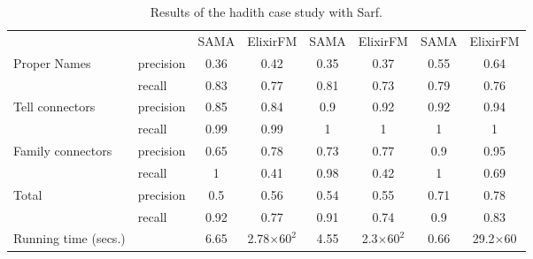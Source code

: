 \begin{table}
\begin{minipage}{\textwidth}
{\begin{tabular}{llcccccc}
          &       & SAMA  & ElixirFM & SAMA  & ElixirFM & SAMA  & ElixirFM \\
    \multicolumn{1}{l}{\multirow{2}[0]{*}{Proper Names}} & precision & 0.36  & 0.42  & 0.35  & 0.37  & 0.55  & 0.64 \\
    \multicolumn{1}{l}{} & recall & 0.83  & 0.77  & 0.81  & 0.73  & 0.79  & 0.76 \\ \hline
    \multicolumn{1}{l}{\multirow{2}[0]{*}{Tell connectors}} & precision & 0.85  & 0.84  & 0.9   & 0.92  & 0.92  & 0.94 \\
    \multicolumn{1}{l}{} & recall & 0.99  & 0.99  & 1     & 1     & 1     & 1 \\ \hline
    \multicolumn{1}{l}{\multirow{2}[0]{*}{Family connectors}} & precision & 0.65  & 0.78  & 0.73  & 0.77  & 0.9   & 0.95 \\
    \multicolumn{1}{l}{} & recall & 1     & 0.41  & 0.98  & 0.42  & 1     & 0.69 \\ \hline
    \multicolumn{1}{l}{\multirow{2}[0]{*}{Total}} & precision & 0.5   & 0.56  & 0.54  & 0.55  & 0.71  & 0.78 \\
    \multicolumn{1}{l}{} & recall & 0.92  & 0.77  & 0.91  & 0.74  & 0.9   & 0.83 \\ \hline
    Running time (secs.) &       & 6.65  & 2.78$\times60^2$ & 4.55  & 2.3$\times60^2$ & 0.66  & 29.2$\times$60 \\
    \hline \hline
\end{tabular}%
}
\end{minipage}
  \caption{Results of the hadith case study with Sarf.}
  \label{t:hadithresallresultsnew}%
\end{table}%

